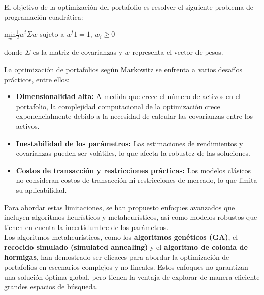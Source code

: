 \documentclass[9pt,a4paper,twoside]{rho-class/rho}
\begin{document}
            \vspace{2mm}El objetivo de la optimización del portafolio es resolver el siguiente problema de programación cuadrática:
        
            \begin{center}
                $\underset{w}{\mathrm{min}}\frac{1}{2}{w}^{t}\Sigma w$ sujeto a ${w}^{t}1=1$, ${w}_{i}\ge 0$     
            \end{center}
        
            \vspace{2mm}donde $\Sigma $ es la matriz de covarianzas y ${w}$ representa el vector de pesos.
        
            \vspace{2mm}La optimización de portafolios según Markowitz se enfrenta a varios desafíos prácticos, entre ellos:
        
            \begin{itemize}
                \item \textbf{Dimensionalidad alta:} A medida que crece el número de  activos en el portafolio, la complejidad computacional de la optimización crece exponencialmente debido a la necesidad de calcular las covarianzas entre los activos.
                \item \textbf{Inestabilidad de los parámetros:} Las estimaciones de rendimientos y covarianzas pueden ser volátiles, lo que afecta la robustez de las soluciones.
                \item \textbf{Costos de transacción y restricciones prácticas:} Los modelos clásicos no consideran costos de transacción ni restricciones de mercado, lo que limita su aplicabilidad.
            \end{itemize}
        
            \noindent Para abordar estas limitaciones, se han propuesto enfoques avanzados que incluyen algoritmos heurísticos y metaheurísticos, así como modelos robustos que tienen en cuenta la incertidumbre de los parámetros.\\
            Los algoritmos metaheurísticos, como los \textbf{algoritmos genéticos (GA)}, el \textbf{recocido simulado (simulated annealing)} y el \textbf{algoritmo de colonia de hormigas}, han demostrado ser eficaces para abordar la optimización de portafolios en escenarios complejos y no lineales. Estos enfoques no garantizan una solución óptima global, pero tienen la ventaja de explorar de manera eficiente grandes espacios de búsqueda.
        
\end{document}
